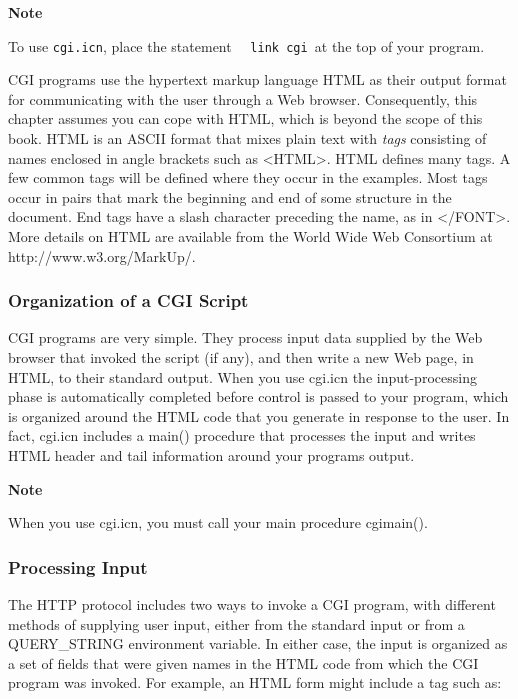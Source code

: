{\sffamily\bfseries
Note}

{\sffamily
To use \texttt{cgi.icn}, place the statement\newline
 \ \ \texttt{link cgi\newline
}at the top of your program.}

CGI programs use the hypertext markup language HTML as their output
format for communicating with the user through a Web browser.
Consequently, this chapter assumes you can cope with HTML, which is
beyond the scope of this book. HTML is an ASCII format that mixes plain
text with \textit{tags} consisting of names enclosed in angle brackets
such as \textsf{{\textless}HTML{\textgreater}}. HTML defines many tags.
A few common tags will be defined where they occur in the examples.
Most tags occur in pairs that mark the beginning and end of some
structure in the document. End tags have a slash character preceding
the name, as in \textsf{{\textless}/FONT{\textgreater}}. More details
on HTML are available from the World Wide Web Consortium at
\textsf{http://www.w3.org/MarkUp/}.

\subsubsection[Organization of a CGI Script]{Organization of a CGI
Script}
CGI programs are very simple. They process input data supplied by the
Web browser that invoked the script (if any), and then write a new Web
page, in HTML, to their standard output. When you use \textsf{cgi.icn}
the input-processing phase is automatically completed before control is
passed to your program, which is organized around the HTML code that
you generate in response to the user. In fact, cgi.icn includes a
\textsf{main()} procedure that processes the input and writes HTML
header and tail information around your program{\textquotesingle}s
output. 

{\sffamily\bfseries
Note}

{\sffamily
When you use cgi.icn, you must call your main procedure cgimain(). }

\subsubsection{Processing Input}

The HTTP protocol includes two ways to invoke a CGI program,
with different methods of supplying user input, either from the
standard input or from a \textsf{QUERY\_STRING} environment variable.
In either case, the input is organized as a set of fields that were
given names in the HTML code from which the CGI program was invoked.
For example, an HTML form might include a tag such as: 

